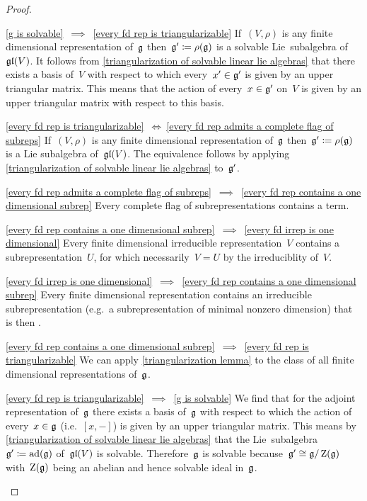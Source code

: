 \begin{proof}
  \leavevmode
  \begin{implicationlist}
    \item[\ref*{g is solvable}~$\implies$~\ref*{every fd rep is triangularizable}]
      If~$(V, \rho)$ is any finite dimensional representation of~$\mathfrak{g}$ then~$\mathfrak{g}' \coloneqq \rho(\mathfrak{g})$ is a solvable Lie~subalgebra of~$\mathfrak{gl}(V)$.
      It follows from \cref{triangularization of solvable linear lie algebras} that there exists a basis of~$V$ with respect to which every~$x' \in \mathfrak{g}'$ is given by an upper triangular matrix.
      This means that the action of every~$x \in \mathfrak{g}'$ on~$V$ is given by an upper triangular matrix with respect to this basis.
    \item[\ref*{every fd rep is triangularizable}~$\iff~$\ref*{every fd rep admits a complete flag of subreps}]
      If~$(V, \rho)$ is any finite dimensional representation of~$\mathfrak{g}$ then~$\mathfrak{g}' \coloneqq \rho(\mathfrak{g})$ is a Lie subalgebra of~$\mathfrak{gl}(V)$.
      The equivalence follows by applying \cref{triangularization of solvable linear lie algebras} to~$\mathfrak{g}'$.
    \item[\ref*{every fd rep admits a complete flag of subreps}~$\implies$~\ref*{every fd rep contains a one dimensional subrep}]
      Every complete flag of subrepresentations contains a {\onedimensional} term.
    \item[\ref*{every fd rep contains a one dimensional subrep}~$\implies$~\ref*{every fd irrep is one dimensional}]
      Every finite dimensional irreducible representation~$V$ contains a {\onedimensional} subrepresentation~$U$, for which necessarily~$V = U$ by the irreduciblity of~$V$.
    \item[\ref*{every fd irrep is one dimensional}~$\implies$~\ref*{every fd rep contains a one dimensional subrep}]
      Every finite dimensional representation contains an irreducible subrepresentation (e.g.\ a subrepresentation of minimal nonzero dimension) that is then {\onedimensional}.
    \item[\ref*{every fd rep contains a one dimensional subrep}~$\implies$~\ref*{every fd rep is triangularizable}]
      We can apply \cref{triangularization lemma} to the class of all finite dimensional representations of~$\mathfrak{g}$.
    \item[\ref*{every fd rep is triangularizable}~$\implies$~\ref*{g is solvable}]
      We find that for the adjoint representation of~$\mathfrak{g}$ there exists a basis of~$\mathfrak{g}$ with respect to which the action of every~$x \in \mathfrak{g}$ (i.e.~$[x,-]$) is given by an upper triangular matrix.
      This means by \cref{triangularization of solvable linear lie algebras} that the Lie~subalgebra~$\mathfrak{g}' \coloneqq \operatorname{ad}(\mathfrak{g})$ of~$\mathfrak{gl}(V)$ is solvable.
      Therefore~$\mathfrak{g}$ is solvable because~$\mathfrak{g}' \cong \mathfrak{g}/\operatorname{Z}(\mathfrak{g})$ with~$\operatorname{Z}(\mathfrak{g})$ being an abelian and hence solvable ideal in~$\mathfrak{g}$.
    \qedhere
  \end{implicationlist}
\end{proof}


